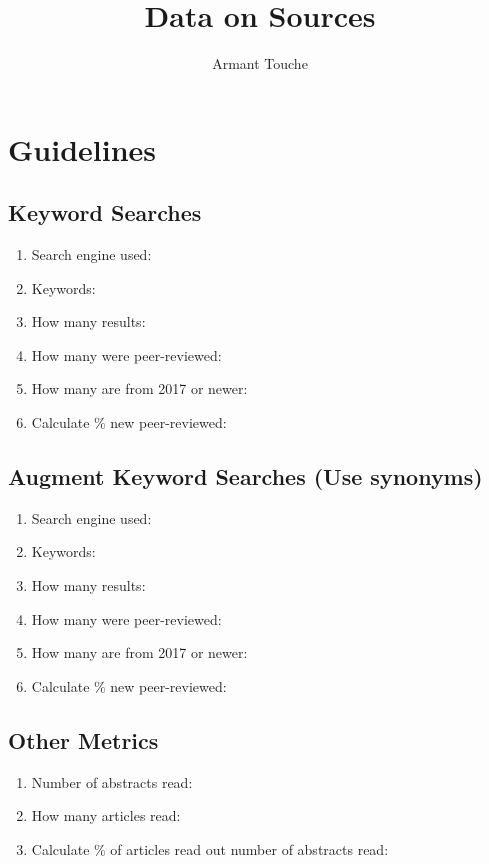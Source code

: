 \documentclass{article}
\begin{document}
\title{\vspace{-2cm}Data on Sources}
\author{Armant Touche}
\maketitle

\section{Guidelines}

    \subsection{Keyword Searches}
    \begin{enumerate}

        \item Search engine used:
        \item Keywords:
        \item How many results:
        \item How many were peer-reviewed:
        \item How many are from 2017 or newer:
        \item Calculate \% new peer-reviewed:

    \end{enumerate}


    \subsection{Augment Keyword Searches (Use synonyms)}
    \begin{enumerate}

        \item Search engine used:
        \item Keywords:
        \item How many results:
        \item How many were peer-reviewed:
        \item How many are from 2017 or newer:
        \item Calculate \% new peer-reviewed:

    \end{enumerate}

    \subsection{Other Metrics}
    \begin{enumerate}

        \item Number of abstracts read:
        \item How many articles read: 
        \item Calculate \% of articles read out number of abstracts read:

    \end{enumerate}
\end{document}
